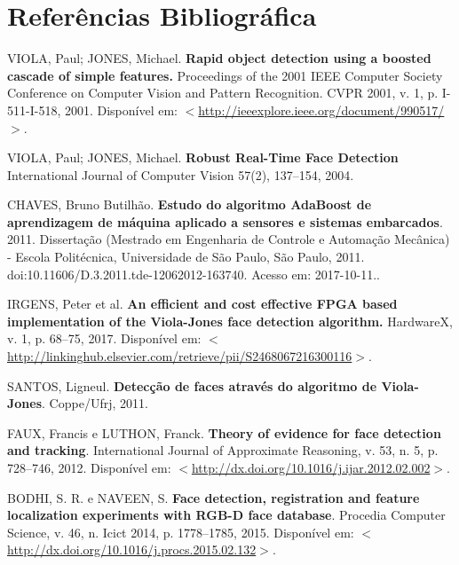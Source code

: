 \documentclass[12pt,a4paper]{article}
\begin{document}
\newpage
\section{Referências Bibliográfica}
\noindent VIOLA, Paul; JONES, Michael. \textbf{Rapid object detection using a boosted cascade of simple features.} Proceedings of the 2001 IEEE Computer Society Conference on Computer Vision and Pattern Recognition. CVPR 2001, v. 1, p. I-511-I-518, 2001. Disponível em: $<$\url{http://ieeexplore.ieee.org/document/990517/}$>$.\\\vspace{0.2cm}

\noindent VIOLA, Paul; JONES, Michael. \textbf{Robust Real-Time Face
Detection}  International Journal of Computer Vision
57(2), 137–154, 2004.\\\vspace{0.2cm}


\noindent CHAVES, Bruno Butilhão. \textbf{Estudo do algoritmo AdaBoost de aprendizagem de máquina aplicado a sensores e sistemas embarcados}. 2011. Dissertação (Mestrado em Engenharia de Controle e Automação Mecânica) - Escola Politécnica, Universidade de São Paulo, São Paulo, 2011. doi:10.11606/D.3.2011.tde-12062012-163740. Acesso em: 2017-10-11..\\\vspace{0.2cm}


\noindent IRGENS, Peter et al. \textbf{An efficient and cost effective FPGA based implementation of the Viola-Jones face detection algorithm.} HardwareX, v. 1, p. 68–75, 2017. Disponível em: $<$\url{http://linkinghub.elsevier.com/retrieve/pii/S2468067216300116}$>$.\\\vspace{0.2cm}

\noindent SANTOS, Ligneul. \textbf{Detecção de faces através do algoritmo de Viola-Jones}. Coppe/Ufrj, 2011.\\\vspace{0.2cm}

\noindent FAUX, Francis e LUTHON, Franck. \textbf{Theory of evidence for face detection and tracking}. International Journal of Approximate Reasoning, v. 53, n. 5, p. 728–746, 2012. Disponível em: $<$\url{http://dx.doi.org/10.1016/j.ijar.2012.02.002}$>$.\\\vspace{0.2cm}

\noindent BODHI, S. R. e NAVEEN, S. \textbf{Face detection, registration and feature localization experiments with RGB-D face database}. Procedia Computer Science, v. 46, n. Icict 2014, p. 1778–1785, 2015. Disponível em: $<$\url{http://dx.doi.org/10.1016/j.procs.2015.02.132}$>$.
\end{document}

